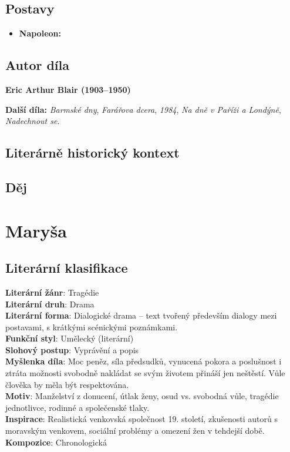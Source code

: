 \documentclass[12pt, a4paper]{article}
\newcommand{\mybf}[1]{\textcolor[RGB]{0, 179, 219}{\textbf{#1}}}
\begin{document}
\subsection*{Postavy}
\begin{itemize}[itemsep=0.3em]
	\item \textbf{Napoleon:}
\end{itemize}

\subsection*{Autor díla}
\textbf{Eric Arthur Blair (1903--1950)}

\textbf{Další díla:} \textit{Barmské dny}, \textit{Farářova dcera}, \textit{1984}, \textit{Na dně v Paříži a Londýně}, \textit{Nadechnout se}.

\subsection*{Literárně historický kontext}

{\color{subsectioncolor}\hrulefill}
\subsection*{\color{subsectioncolor}Děj}

\newpage

\section{Maryša}

\subsection*{Literární klasifikace}
\mybf{Literární žánr}: Tragédie\\[3pt]
\mybf{Literární druh}: Drama\\[3pt]
\mybf{Literární forma}: Dialogické drama -- text tvořený především dialogy mezi postavami, s krátkými scénickými poznámkami.\\[3pt]
\mybf{Funkční styl}: Umělecký (literární)\\[3pt]
\mybf{Slohový postup}: Vyprávění a popis\\[10pt]
\mybf{Myšlenka díla}: Moc peněz, síla předsudků, vynucená pokora a poslušnost i ztráta možnosti svobodně nakládat se svým životem přináší jen neštěstí. Vůle člověka by měla být respektována.\\[10pt]
\mybf{Motiv}: Manželství z donucení, útlak ženy, osud vs. svobodná vůle, tragédie jednotlivce, rodinné a společenské tlaky.\\[10pt]
\mybf{Inspirace}: Realistická venkovská společnost 19. století, zkušenosti autorů s moravským venkovem, sociální problémy a omezení žen v tehdejší době.\\[10pt]
\mybf{Kompozice}: Chronologická
\end{document}
